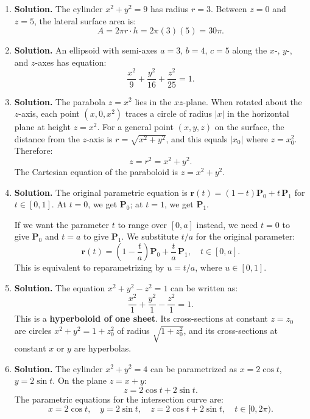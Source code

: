 \begin{enumerate}
\item \textbf{Solution.}
The cylinder \( x^2 + y^2 = 9 \) has radius \( r = 3 \). Between \( z = 0 \) and \( z = 5 \), the lateral surface area is:
\[
A = 2\pi r \cdot h = 2\pi(3)(5) = 30\pi.
\]

\item \textbf{Solution.}
An ellipsoid with semi-axes \( a = 3 \), \( b = 4 \), \( c = 5 \) along the \( x \)-, \( y \)-, and \( z \)-axes has equation:
\[
\frac{x^2}{9} + \frac{y^2}{16} + \frac{z^2}{25} = 1.
\]

\item \textbf{Solution.}
The parabola \( z = x^2 \) lies in the \( xz \)-plane. When rotated about the \( z \)-axis, each point \( (x, 0, x^2) \) traces a circle of radius \( |x| \) in the horizontal plane at height \( z = x^2 \). For a general point \( (x, y, z) \) on the surface, the distance from the \( z \)-axis is \( r = \sqrt{x^2 + y^2} \), and this equals \( |x_0| \) where \( z = x_0^2 \). Therefore:
\[
z = r^2 = x^2 + y^2.
\]
The Cartesian equation of the paraboloid is \( z = x^2 + y^2 \).

\item \textbf{Solution.}
The original parametric equation is \( \mathbf{r}(t) = (1 - t)\mathbf{P}_0 + t\,\mathbf{P}_1 \) for \( t \in [0, 1] \). At \( t = 0 \), we get \( \mathbf{P}_0 \); at \( t = 1 \), we get \( \mathbf{P}_1 \).

If we want the parameter \( t \) to range over \( [0, a] \) instead, we need \( t = 0 \) to give \( \mathbf{P}_0 \) and \( t = a \) to give \( \mathbf{P}_1 \). We substitute \( t/a \) for the original parameter:
\[
\mathbf{r}(t) = \left(1 - \frac{t}{a}\right)\mathbf{P}_0 + \frac{t}{a}\,\mathbf{P}_1, \quad t \in [0, a].
\]
This is equivalent to reparametrizing by \( u = t/a \), where \( u \in [0, 1] \).

\item \textbf{Solution.}
The equation \( x^2 + y^2 - z^2 = 1 \) can be written as:
\[
\frac{x^2}{1} + \frac{y^2}{1} - \frac{z^2}{1} = 1.
\]
This is a \textbf{hyperboloid of one sheet}. Its cross-sections at constant \( z = z_0 \) are circles \( x^2 + y^2 = 1 + z_0^2 \) of radius \( \sqrt{1 + z_0^2} \), and its cross-sections at constant \( x \) or \( y \) are hyperbolas.

\item \textbf{Solution.}
The cylinder \( x^2 + y^2 = 4 \) can be parametrized as \( x = 2\cos t \), \( y = 2\sin t \). On the plane \( z = x + y \):
\[
z = 2\cos t + 2\sin t.
\]
The parametric equations for the intersection curve are:
\[
x = 2\cos t, \quad y = 2\sin t, \quad z = 2\cos t + 2\sin t, \quad t \in [0, 2\pi).
\]


\end{enumerate}
